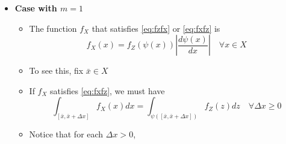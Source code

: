 \documentclass[12pt,a4paper]{article}
\begin{document}
\begin{itemize}
\item \textbf{Case with $m=1$}
  \begin{itemize}
  \item The function $f_{X}$ that satisfies \eqref{eq:fzfx} or \eqref{eq:fxfz} is
    \begin{equation}\label{eq:fx1}%
      f_{X}(x) = f_{Z}(\psi(x))\left| \frac{d\psi(x)}{dx}\right| \quad \forall x \in X
    \end{equation}
  \item To see this, fix $\bar{x}\in X$
  \item If $f_{X}$ satisfies \eqref{eq:fxfz}, we must have
    \begin{equation}\label{eq:fxfz1}%
      \int_{[\bar{x}, \bar{x}+\Delta x]} f_{X}(x)dx
      = 
      \int_{\psi([\bar{x}, \bar{x}+\Delta x])} f_{Z}(z)dz
    \quad \forall \Delta x\geq 0
    \end{equation}
  \item Notice that for each $\Delta x> 0$,
\end{itemize}
\end{itemize}
\end{document}

